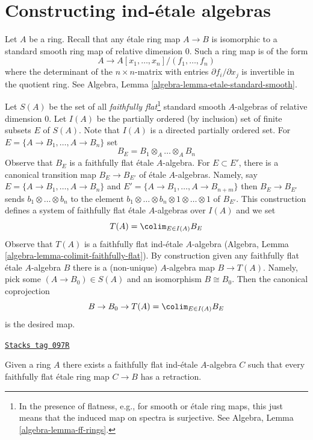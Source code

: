 \section{Constructing ind-\'etale algebras}
\label{proetale-section-construction-ind-etale}
Let $A$ be a ring. Recall that any \'etale ring map $A \to B$ is isomorphic
to a standard smooth ring map of relative dimension $0$. Such a ring map
is of the form
$$
A \longrightarrow A[x_1, \ldots, x_n]/(f_1, \ldots, f_n)
$$
where the determinant of the $n \times n$-matrix with entries
$\partial f_i/\partial x_j$ is invertible in the quotient ring. See
Algebra, Lemma \ref{algebra-lemma-etale-standard-smooth}.

\medskip\noindent
Let $S(A)$ be the set of all {\it faithfully flat}\footnote{In the presence
of flatness, e.g., for smooth or \'etale ring maps,
this just means that the induced map on spectra is surjective. See
Algebra, Lemma \ref{algebra-lemma-ff-rings}.}
standard smooth $A$-algebras of relative dimension $0$.
Let $I(A)$ be the partially ordered (by inclusion) set of finite
subsets $E$ of $S(A)$. Note that $I(A)$ is a directed partially
ordered set. For $E = \{A \to B_1, \ldots, A \to B_n\}$ set
$$
B_E = B_1 \otimes_A \ldots \otimes_A B_n
$$
Observe that $B_E$ is a faithfully flat \'etale $A$-algebra.
For $E \subset E'$, there is a canonical transition map $B_E \to B_{E'}$
of \'etale $A$-algebras. Namely, say $E = \{A \to B_1, \ldots, A \to B_n\}$
and $E' = \{A \to B_1, \ldots, A \to B_{n + m}\}$ then
$B_E \to B_{E'}$ sends $b_1 \otimes \ldots \otimes b_n$ to the
element $b_1 \otimes \ldots \otimes b_n \otimes 1 \otimes \ldots \otimes 1$
of $B_{E'}$. This construction defines a system of faithfully flat
\'etale $A$-algebras over $I(A)$ and we set
$$
T(A) = \colim_{E \in I(A)} B_E
$$
Observe that $T(A)$ is a faithfully flat ind-\'etale $A$-algebra
(Algebra, Lemma \ref{algebra-lemma-colimit-faithfully-flat}). By construction
given any faithfully flat \'etale $A$-algebra $B$ there is a (non-unique)
$A$-algebra map $B \to T(A)$. Namely, pick some $(A \to B_0) \in S(A)$
and an isomorphism $B \cong B_0$. Then the canonical coprojection
$$
B \to B_0 \to
T(A) = \colim_{E \in I(A)} B_E
$$
is the desired map.

\begin{lemma}
\label{proetale-lemma-first-construction}
\href{https://stacks.math.columbia.edu/tag/097R}{\texttt{Stacks tag 097R}}

Given a ring $A$ there exists a faithfully flat ind-\'etale $A$-algebra $C$
such that every faithfully flat \'etale ring map $C \to B$ has a retraction.
\end{lemma}


